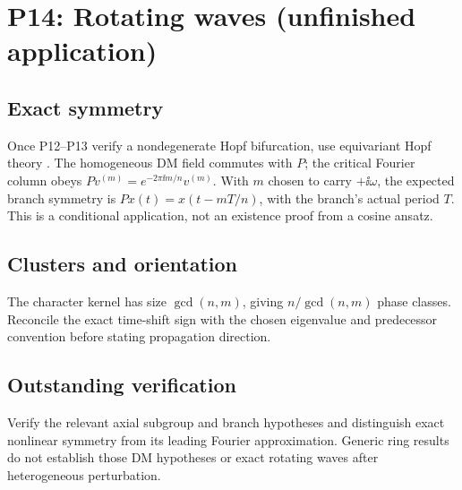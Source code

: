 \section{P14: Rotating waves (unfinished application)}
\label{sec:P14}
\subsection{Exact symmetry}\label{slot:P14-1}
Once P12--P13 verify a nondegenerate Hopf bifurcation, use equivariant
Hopf theory \cite[Theorem~3.7]{Stewart2024}. The homogeneous DM field
commutes with $P$; the critical Fourier column obeys
$Pv^{(m)}=e^{-2\pi\ii m/n}v^{(m)}$. With $m$ chosen to carry
$+\ii\omega$, the expected branch symmetry is
$Px(t)=x(t-mT/n)$, with the branch's actual period $T$.
This is a conditional application, not an existence proof from a cosine ansatz.
\subsection{Clusters and orientation}\label{slot:P14-2}
The character kernel has size $\gcd(n,m)$, giving $n/\gcd(n,m)$
phase classes. Reconcile the exact time-shift sign with the chosen
eigenvalue and predecessor convention before stating propagation direction.
\subsection{Outstanding verification}\label{slot:P14-3}
Verify the relevant axial subgroup and branch hypotheses and distinguish
exact nonlinear symmetry from its leading Fourier approximation.
Generic ring results do not establish those DM hypotheses or exact
rotating waves after heterogeneous perturbation.
